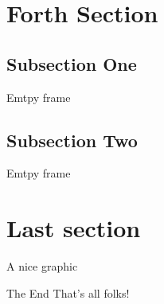 \documentclass[aspectratio=169, arial]{beamer}    %
\begin{document}
\section{Forth Section}
\subsection{Subsection One}
\begin{frame}
	Emtpy frame
\end{frame}
\subsection{Subsection Two}
\begin{frame}
	Emtpy frame
\end{frame}

\section{Last section}
\begin{frame}{A nice graphic}
    \centering
    
\end{frame}
\begin{frame}{The End}
    \centering
    \LARGE That's all folks!
\end{frame}
\end{document}
